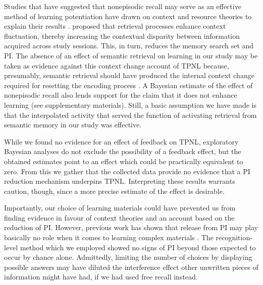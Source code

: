 \documentclass[../main.tex]{subfiles}
\begin{document}
Studies that have suggested that nonepisodic recall may serve as an effective
method of learning potentiation have drawn on context and resource theories 
to explain their results \citep{divisRetrievalSpeedsContext2014, 
pastotterRetrievalLearningFacilitates2011}. 
\cite{divisRetrievalSpeedsContext2014} proposed that retrieval processes 
enhance context fluctuation, thereby increasing the contextual disparity 
between information acquired across study sessions. This, in turn, reduces 
the memory search set and PI. The absence of an effect of semantic retrieval 
on learning in our study may be taken as evidence against this context 
change account of TPNL because, presumably, semantic retrieval should have 
produced the internal context change required for resetting the encoding 
process \citep{pastotterRetrievalLearningFacilitates2011}. A Bayesian 
estimate of the effect of nonepisodic recall also lends support for the 
claim that it does not enhance learning (see supplementary materials). 
Still, a basic assumption we have made is that the interpolated activity 
that served the function of activating retrieval from semantic memory in our 
study was effective. 

While we found no evidence for an effect of feedback on TPNL, exploratory 
Bayesian analyses do not exclude the possibility of a feedback effect, but 
the obtained estimates point to an effect which could be practically 
equivalent to zero. From this we gather that the collected data provide no 
evidence that a PI reduction mechanism underpins TPNL. Interpreting these 
results warrants caution, though, since a more precise estimate of the 
effect is desirable.

Importantly, our choice of learning materials could have prevented us from 
finding evidence in favour of context theories and an account based on the 
reduction of PI. However, previous work has shown that release from PI may 
play basically no role when it comes to learning complex materials 
\citep{wissmanInterimTestEffect2011}. The recognition-level method which we 
employed showed no signs of PI beyond those expected to occur by chance 
alone. Admittedly, limiting the number of choices by displaying possible 
answers may have diluted the interference effect other unwritten pieces of 
information might have had, if we had used free recall instead.
\end{document}
